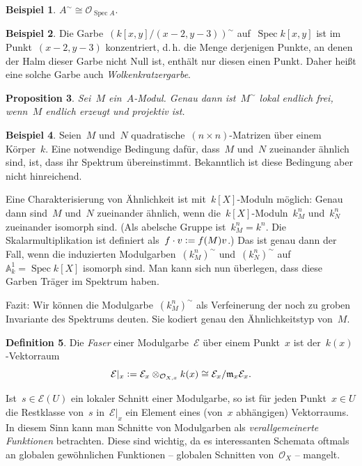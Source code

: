 \documentclass[a4paper,ngerman,12pt]{scrartcl}
\theoremstyle{definition}
\newtheorem{defn}{Definition}[section]
\newtheorem{ex}[defn]{Beispiel}
\theoremstyle{plain}
\newtheorem{prop}[defn]{Proposition}
\theoremstyle{remark}
\renewcommand{\AA}{\mathbb{A}}
\newcommand{\E}{\mathcal{E}}
\renewcommand{\O}{\mathcal{O}}
\newcommand{\mmm}{\mathfrak{m}}
\DeclareMathOperator{\Spec}{Spec}
\newcommand{\defeq}{\vcentcolon=}
\begin{document}
\begin{ex}$A^\sim \cong \O_{\Spec A}$.\end{ex}

\begin{ex}Die Garbe~$(k[x,y]/(x-2,y-3))^\sim$ auf~$\Spec k[x,y]$ ist im
Punkt~$(x-2,y-3)$ konzentriert, d.\,h. die Menge derjenigen Punkte, an denen
der Halm dieser Garbe nicht Null ist, enthält nur diesen einen Punkt. Daher
heißt eine solche Garbe auch \emph{Wolkenkratzergarbe}.\end{ex}

\begin{prop}Sei~$M$ ein~$A$-Modul. Genau dann ist~$M^\sim$ lokal endlich frei,
wenn~$M$ endlich erzeugt und projektiv ist.\end{prop}

\begin{ex}Seien~$M$ und~$N$ quadratische~$(n \times n)$-Matrizen über einem
Körper~$k$. Eine notwendige Bedingung dafür, dass~$M$ und~$N$ zueinander
ähnlich sind, ist, dass ihr Spektrum übereinstimmt. Bekanntlich ist diese
Bedingung aber nicht hinreichend.

Eine Charakterisierung von Ähnlichkeit ist
mit~$k[X]$-Moduln möglich: Genau dann sind~$M$ und~$N$ zueinander ähnlich, wenn
die~$k[X]$-Moduln~$k^n_M$ und~$k^n_N$ zueinander isomorph sind. (Als
abelsche Gruppe ist~$k^n_M = k^n$. Die Skalarmultiplikation ist definiert
als~$f \cdot v \defeq f(M)v$.) Das ist genau dann der Fall, wenn die
induzierten Modulgarben~$(k^n_M)^\sim$ und~$(k^n_N)^\sim$ auf~$\AA^1_k = \Spec
k[X]$ isomorph sind. Man kann sich nun überlegen, dass diese Garben Träger im
Spektrum haben.

Fazit: Wir können die Modulgarbe~$(k^n_M)^\sim$ als Verfeinerung der noch zu
groben Invariante des Spektrums deuten. Sie kodiert genau den Ähnlichkeitstyp
von~$M$.\end{ex}

\begin{defn}Die \emph{Faser} einer Modulgarbe~$\E$ über einem Punkt~$x$ ist
der~$k(x)$-Vektorraum
\[ \E|_x \defeq \E_x \otimes_{\O_{X,x}} k(x) \cong \E_x/\mmm_x \E_x. \]
\end{defn}

Ist~$s \in \E(U)$ ein lokaler Schnitt einer Modulgarbe, so ist für jeden
Punkt~$x \in U$ die Restklasse von~$s$ in~$\E|_x$ ein Element eines (von~$x$
abhängigen) Vektorraums. In diesem Sinn kann man Schnitte von Modulgarben als
\emph{verallgemeinerte Funktionen} betrachten. Diese sind wichtig, da es
interessanten Schemata oftmals an globalen gewöhnlichen Funktionen -- globalen
Schnitten von~$\O_X$ -- mangelt.
\end{document}
